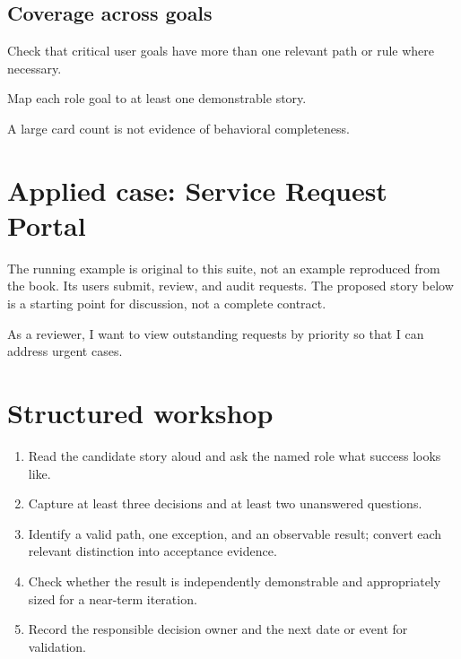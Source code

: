 \documentclass[11pt,letterpaper]{article}
\begin{document}
\subsection{Coverage across goals}
Check that critical user goals have more than one relevant path or rule where necessary.

\begin{tcolorbox}[colback=tealback,colframe=navy,title={Engineering translation},breakable]
Map each role goal to at least one demonstrable story.

\end{tcolorbox}
\begin{tcolorbox}[colback=amberback,colframe=navy,title={Failure mode to watch},breakable]
A large card count is not evidence of behavioral completeness.

\end{tcolorbox}
\section{Applied case: Service Request Portal}
The running example is original to this suite, not an example reproduced from the book. Its users submit, review, and audit requests. The proposed story below is a starting point for discussion, not a complete contract.

\begin{tcolorbox}[colback=blueback,colframe=navy,title={Candidate story},breakable]
As a reviewer, I want to view outstanding requests by priority so that I can address urgent cases.

\end{tcolorbox}
\section{Structured workshop}
\begin{enumerate}[leftmargin=*,itemsep=3pt]
\item Read the candidate story aloud and ask the named role what success looks like.
\item Capture at least three decisions and at least two unanswered questions.
\item Identify a valid path, one exception, and an observable result; convert each relevant distinction into acceptance evidence.
\item Check whether the result is independently demonstrable and appropriately sized for a near-term iteration.
\item Record the responsible decision owner and the next date or event for validation.
\end{enumerate}
\end{document}
